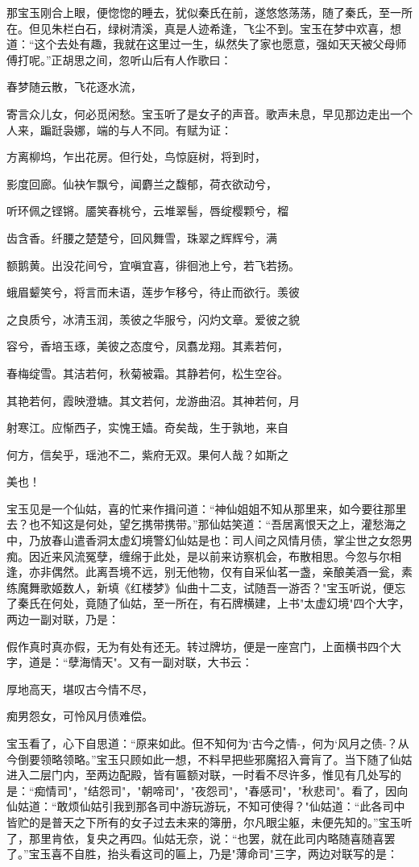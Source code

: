 那宝玉刚合上眼，便惚惚的睡去，犹似秦氏在前，遂悠悠荡荡，随了秦氏，至一所在。但见朱栏白石，绿树清溪，真是人迹希逢，飞尘不到。宝玉在梦中欢喜，想道：“这个去处有趣，我就在这里过一生，纵然失了家也愿意，强如天天被父母师傅打呢。”正胡思之间，忽听山后有人作歌曰：

春梦随云散，飞花逐水流，

寄言众儿女，何必觅闲愁。宝玉听了是女子的声音。歌声未息，早见那边走出一个人来，蹁跹袅娜，端的与人不同。有赋为证：

方离柳坞，乍出花房。但行处，鸟惊庭树，将到时，

影度回廊。仙袂乍飘兮，闻麝兰之馥郁，荷衣欲动兮，

听环佩之铿锵。靥笑春桃兮，云堆翠髻，唇绽樱颗兮，榴

齿含香。纤腰之楚楚兮，回风舞雪，珠翠之辉辉兮，满

额鹅黄。出没花间兮，宜嗔宜喜，徘徊池上兮，若飞若扬。

蛾眉颦笑兮，将言而未语，莲步乍移兮，待止而欲行。羡彼

之良质兮，冰清玉润，羡彼之华服兮，闪灼文章。爱彼之貌

容兮，香培玉琢，美彼之态度兮，凤翥龙翔。其素若何，

春梅绽雪。其洁若何，秋菊被霜。其静若何，松生空谷。

其艳若何，霞映澄塘。其文若何，龙游曲沼。其神若何，月

射寒江。应惭西子，实愧王嫱。奇矣哉，生于孰地，来自

何方，信矣乎，瑶池不二，紫府无双。果何人哉？如斯之

美也！

宝玉见是一个仙姑，喜的忙来作揖问道：“神仙姐姐不知从那里来，如今要往那里去？也不知这是何处，望乞携带携带。”那仙姑笑道：“吾居离恨天之上，灌愁海之中，乃放春山遣香洞太虚幻境警幻仙姑是也：司人间之风情月债，掌尘世之女怨男痴。因近来风流冤孽，缠绵于此处，是以前来访察机会，布散相思。今忽与尔相逢，亦非偶然。此离吾境不远，别无他物，仅有自采仙茗一盏，亲酿美酒一瓮，素练魔舞歌姬数人，新填《红楼梦》仙曲十二支，试随吾一游否？"宝玉听说，便忘了秦氏在何处，竟随了仙姑，至一所在，有石牌横建，上书"太虚幻境"四个大字，两边一副对联，乃是：

假作真时真亦假，无为有处有还无。转过牌坊，便是一座宫门，上面横书四个大字，道是：“孽海情天"。又有一副对联，大书云：

厚地高天，堪叹古今情不尽，

痴男怨女，可怜风月债难偿。

宝玉看了，心下自思道：“原来如此。但不知何为`古今之情-，何为`风月之债-？从今倒要领略领略。”宝玉只顾如此一想，不料早把些邪魔招入膏肓了。当下随了仙姑进入二层门内，至两边配殿，皆有匾额对联，一时看不尽许多，惟见有几处写的是：“痴情司"，"结怨司"，"朝啼司"，"夜怨司"，"春感司"，"秋悲司"。看了，因向仙姑道：“敢烦仙姑引我到那各司中游玩游玩，不知可使得？"仙姑道：“此各司中皆贮的是普天之下所有的女子过去未来的簿册，尔凡眼尘躯，未便先知的。”宝玉听了，那里肯依，复央之再四。仙姑无奈，说：“也罢，就在此司内略随喜随喜罢了。”宝玉喜不自胜，抬头看这司的匾上，乃是"薄命司"三字，两边对联写的是：


